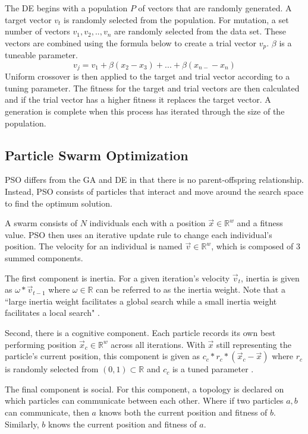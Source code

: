 \documentclass[twoside,11pt]{article}
\newcommand{\Rw}{\mathbb{R}^w }
\begin{document}
The DE begins with a population $P$ of vectors that are randomly generated. A target vector $v_t$ is randomly selected from the population. For mutation, a set number of vectors $v_1, v_2,.., v_n$ are randomly selected from the data set. These vectors are combined using the formula below to create a trial vector $v_p$. $\beta$ is a tuneable parameter. $$v_j = v_1 + \beta(x_2 - x_3) + ... + \beta(x_{n-} - x_n)$$
Uniform crossover is then applied to the target and trial vector according to a tuning parameter. The fitness for the target and trial vectors are then calculated and if the trial vector has a higher fitness it replaces the target vector. A generation is complete when this process has iterated through the size of the population. 

\subsection{Particle Swarm Optimization}

	PSO differs from the GA and DE in that there is no parent-offspring relationship. Instead, PSO consists of particles that interact and move around the search space to find the optimum solution. 
	
	A swarm consists of $N$ individuals each with a position $\vec{x} \in \Rw$ and a fitness value. 
	PSO then uses an iterative update rule to change each individual's position. The velocity for an individual is named $\vec{v} \in \Rw$, which is composed of 3 summed components.
	
	The first component is inertia. For a given iteration's velocity $\vec{v}_t$, inertia is given as $\omega * \vec{v}_{t-1}$ where $\omega \in \mathbb{R}$ can be referred to as the inertia weight. Note that a ``large inertia weight facilitates a global search while a small inertia weight facilitates a local search" \citep{empirical-pso}.
	
	Second, there is a cognitive component. 
	Each particle records its own best performing position $\vec{x}_c \in \Rw$ across all iterations. 
	With $\vec{x}$ still representing the particle's current position, this component is given as $c_c * r_c * (\vec{x}_c - \vec{x})$ where $r_c$ is randomly selected from $(0,1) \subset \mathbb{R}$ and $c_c$ is a tuned parameter \citep{og-pso}.
	
	The final component is social. 
	For this component, a topology is declared on which particles can communicate between each other.
	Where if two particles $a,b$ can communicate, then $a$ knows both the current position and fitness of $b$.
	Similarly, $b$ knows the current position and fitness of $a$.
	
\end{document}

